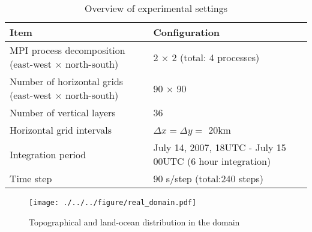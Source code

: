 \begin{table}[tb]
\begin{center}
  \caption{Overview of experimental settings}
  \label{tab:grids}
  \begin{tabularx}{150mm}{|l|X|} \hline
    \rowcolor[gray]{0.9} Item & Configuration \\ \hline
    MPI process decomposition (east-west $\times$ north-south) & 2 $\times$ 2 (total: 4 processes) \\ \hline
    Number of horizontal grids (east-west $\times$ north-south) & 90 $\times$ 90  \\ \hline
    Number of vertical layers   & 36                   \\ \hline
    Horizontal grid intervals   & $\Delta x  = \Delta y = $ 20km       \\ \hline
    Integration period & July 14, 2007, 18UTC - July 15 00UTC (6 hour integration) \\ \hline
    Time step & 90 s/step (total:240 steps) \\ \hline
  \end{tabularx}
\end{center}
\end{table}

\begin{figure}[tb]
\begin{center}
  \texttt{[image: ./../../figure/real\_domain.pdf]}\\
  \caption{Topographical and land-ocean distribution in the domain}
  \label{fig:tutrial_real_domain}
\end{center}
\end{figure}


